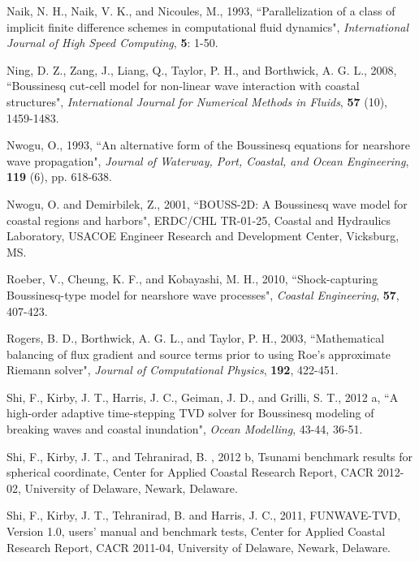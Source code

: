 \documentclass[11pt]{article}
\begin{document}
\begin{description}
\item Naik, N. H., Naik, V. K., and Nicoules, M., 1993, ``Parallelization of a class of implicit finite difference schemes in computational fluid dynamics", {\em  International Journal of High Speed Computing},  {\bf 5}: 1-50.


\item Ning, D. Z., Zang, J., Liang, Q., Taylor, P. H., and Borthwick, A. G. L., 2008, ``Boussinesq cut-cell model for non-linear wave interaction with coastal structures", {\em International Journal for Numerical Methods in Fluids}, {\bf 57} (10), 1459-1483.

\item Nwogu, O., 1993, ``An alternative form of the Boussinesq equations for nearshore wave propagation", {\em Journal of Waterway, Port, Coastal, and Ocean Engineering}, {\bf 119} (6), pp. 618-638. 

\item Nwogu, O. and Demirbilek, Z., 2001, ``BOUSS-2D: A Boussinesq wave model for coastal regions and harbors",  ERDC/CHL TR-01-25, Coastal and Hydraulics Laboratory, USACOE Engineer Research and Development Center,  Vicksburg, MS.

\item Roeber, V., Cheung, K. F., and Kobayashi, M. H., 2010, ``Shock-capturing Boussinesq-type model for nearshore wave processes", {\em Coastal Engineering}, {\bf 57}, 407-423.

\item Rogers, B. D., Borthwick, A. G. L., and Taylor, P. H., 2003, ``Mathematical balancing of flux gradient and source terms prior to using Roe's approximate Riemann solver", {\em Journal of Computational Physics}, {\bf 192}, 422-451.


\item Shi, F., Kirby, J. T., Harris, J. C., Geiman, J. D., and Grilli, S. T., 2012 a, ``A high-order adaptive time-stepping TVD solver for Boussinesq modeling of breaking waves and coastal inundation", {\em Ocean Modelling}, 43-44, 36-51.


\item Shi, F., Kirby, J. T., and Tehranirad, B. , 2012 b, Tsunami benchmark results for
spherical coordinate, Center for Applied Coastal Research Report, CACR 2012-02, University of Delaware, Newark, Delaware. 

\item Shi, F., Kirby, J. T., Tehranirad, B. and Harris, J. C., 2011, FUNWAVE-TVD, Version 1.0, users' manual and benchmark tests, Center for Applied Coastal Research Report, CACR 2011-04, University of Delaware, Newark, Delaware. 



\end{description}
\end{document}
